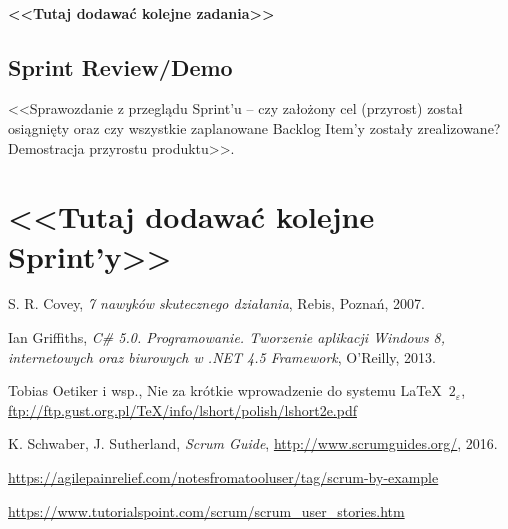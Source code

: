 \documentclass[a4paper]{article}
\begin{document}
\paragraph{<<Tutaj dodawać kolejne zadania>>}


\subsection{Sprint Review/Demo}
<<Sprawozdanie z przeglądu Sprint'u -- czy założony cel (przyrost) został osiągnięty oraz czy wszystkie zaplanowane Backlog Item'y zostały zrealizowane? Demostracja przyrostu produktu>>.

\section*{<<Tutaj dodawać kolejne Sprint'y>>}


\begin{thebibliography}{9}

 S. R. Covey, {\em 7 nawyków skutecznego działania}, Rebis, Poznań, 2007.

 Ian Griffiths, {\em C\# 5.0. Programowanie. Tworzenie aplikacji Windows 8, internetowych oraz biurowych w .NET 4.5 Framework}, O’Reilly, 2013.

 Tobias Oetiker i wsp., Nie za krótkie wprowadzenie do systemu \LaTeX  \ $2_\varepsilon$, \url{ftp://ftp.gust.org.pl/TeX/info/lshort/polish/lshort2e.pdf}

 K. Schwaber, J. Sutherland, {\em Scrum Guide}, \url{http://www.scrumguides.org/}, 2016.

 \url{https://agilepainrelief.com/notesfromatooluser/tag/scrum-by-example}

 \url{https://www.tutorialspoint.com/scrum/scrum_user_stories.htm}

\end{thebibliography}
\end{document}
